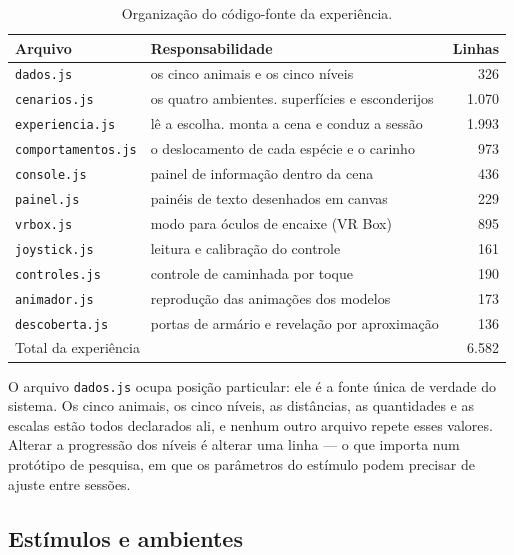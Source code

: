 \begin{table}[htbp]
\centering
\caption{Organização do código-fonte da experiência.}
\label{tab:arquivos}
\begin{tabular}{llr}
\toprule
\textbf{Arquivo} & \textbf{Responsabilidade} & \textbf{Linhas} \\
\midrule
\texttt{dados.js}         & os cinco animais e os cinco níveis             & 326 \\
\texttt{cenarios.js}      & os quatro ambientes. superfícies e esconderijos& 1.070 \\
\texttt{experiencia.js}   & lê a escolha. monta a cena e conduz a sessão   & 1.993 \\
\texttt{comportamentos.js} & o deslocamento de cada espécie e o carinho     & 973 \\
\texttt{console.js}       & painel de informação dentro da cena            & 436 \\
\texttt{painel.js}        & painéis de texto desenhados em canvas          & 229 \\
\texttt{vrbox.js}         & modo para óculos de encaixe (VR Box)           & 895 \\
\texttt{joystick.js}      & leitura e calibração do controle               & 161 \\
\texttt{controles.js}     & controle de caminhada por toque                & 190 \\
\texttt{animador.js}      & reprodução das animações dos modelos           & 173 \\
\texttt{descoberta.js}    & portas de armário e revelação por aproximação  & 136 \\
\midrule
\multicolumn{2}{l}{Total da experiência} & 6.582 \\
\bottomrule
\end{tabular}
\end{table}

O arquivo \texttt{dados.js} ocupa posição particular: ele é a fonte única
de verdade do sistema. Os cinco animais, os cinco níveis, as distâncias,
as quantidades e as escalas estão todos declarados ali, e nenhum outro
arquivo repete esses valores. Alterar a progressão dos níveis é alterar
uma linha --- o que importa num protótipo de pesquisa, em que os
parâmetros do estímulo podem precisar de ajuste entre sessões.

\subsection{Estímulos e ambientes}

